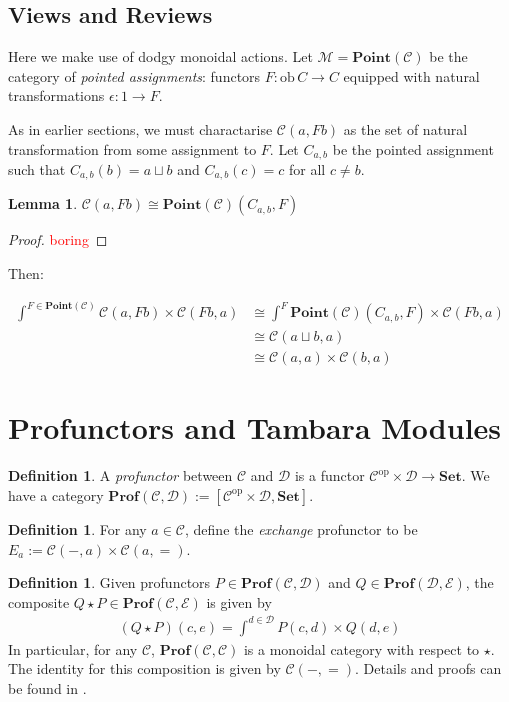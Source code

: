 \documentclass[11pt,a4paper]{amsart}
\theoremstyle{plain}
\newtheorem{lemma}[theorem]{Lemma}
\theoremstyle{definition}
\newtheorem{definition}[theorem]{Definition}
\newcommand{\C}{\mathscr{C}}
\newcommand{\D}{\mathscr{D}}
\newcommand{\E}{\mathscr{E}}
\newcommand{\M}{\mathscr{M}}
\newcommand{\Set}{\mathbf{Set}}
\newcommand{\Prof}{\mathbf{Prof}}
\newcommand{\Point}{\mathbf{Point}}
\newcommand{\op}{\mathrm{op}}
\newcommand{\ob}{\mathrm{ob}\,}
\newcommand{\todo}[1]{\textcolor{red}{\small #1}}
\begin{document}
\subsection{Views and Reviews}

Here we make use of dodgy monoidal actions. Let $\M=\Point(\C)$ be the category of \emph{pointed assignments}: functors $
F : \ob C \to C$ equipped with natural transformations $\epsilon : 1 \to F$.

As in earlier sections, we must charactarise $\C(a, Fb)$ as the set of natural transformation from some assignment to $F$. Let $C_{a,b}$ be the pointed assignment such that $C_{a,b}(b) = a \sqcup b$ and $C_{a,b}(c) = c$ for all $c \neq b$.

\begin{lemma}
$\C(a, Fb) \cong \Point(\C)(C_{a,b}, F)$
\end{lemma}
\begin{proof}
\todo{boring}
\end{proof}

Then:

\begin{align*}
\int^{F \in \Point(\C)} \C(a, F b) \times \C(F b, a) 
&\cong \int^{F} \Point(\C)(C_{a,b}, F) \times \C(F b, a) \\ 
&\cong \C(a \sqcup b, a) \\
&\cong \C(a, a) \times \C(b, a)
\end{align*}



\section{Profunctors and Tambara Modules}

\begin{definition}
A \emph{profunctor} between $\C$ and $\D$ is a functor $\C^\op \times \D \to \Set$. We have a category $\Prof(\C, \D) := [\C^\op \times \D, \Set]$.
\end{definition}

\begin{definition}
For any $a \in \C$, define the \emph{exchange} profunctor to be $E_a := \C(-,a) \times \C(a,=)$. 
\end{definition}

\begin{definition}
Given profunctors $P \in \Prof(\C, \D)$ and $Q \in \Prof(\D,\E)$, the composite $Q \star P \in \Prof(\C, \E)$ is given by
\begin{align*}
(Q \star P)(c,e) = \int^{d \in \D} P(c,d) \times Q(d,e)
\end{align*}
In particular, for any $\C$, $\Prof(\C,\C)$ is a monoidal category with respect to $\star$. The identity for this composition is given by $\C(-,=)$. Details and proofs can be found in \cite{loregian2015co}.
\end{definition}
\end{document}
